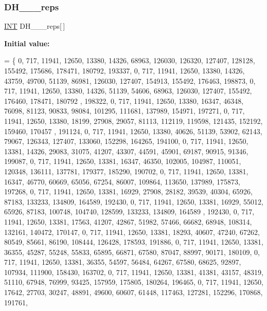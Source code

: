 \subsubsection{\texorpdfstring{D\+H\+\_\+\_\+\_\+reps}{DH\_4\_8\_reps}}
{\footnotesize\ttfamily \mbox{\hyperlink{galois_8h_a09fddde158a3a20bd2dcadb609de11dc}{I\+NT}} D\+H\+\_\+\_\+\_\+reps\mbox{[}$\,$\mbox{]}}

{\bfseries Initial value\+:}
\begin{DoxyCode}
= \{
    0, 717, 11941, 12650, 13380, 14326, 68963, 126030, 126320, 127407, 128128, 155492, 175686, 178471, 
      180792, 193337, 
    0, 717, 11941, 12650, 13380, 14326, 43759, 49700, 51139, 86981, 126030, 127407, 154913, 155492, 176463,
       198873, 
    0, 717, 11941, 12650, 13380, 14326, 51139, 54606, 68963, 126030, 127407, 155492, 176460, 178471, 180792
      , 198322, 
    0, 717, 11941, 12650, 13380, 16347, 46348, 76098, 81123, 90833, 98084, 101295, 111681, 137989, 154971, 
      197271, 
    0, 717, 11941, 12650, 13380, 18199, 27908, 29057, 81113, 112119, 119598, 121435, 152192, 159460, 170457
      , 191124, 
    0, 717, 11941, 12650, 13380, 40626, 51139, 53902, 62143, 79067, 126343, 127407, 133060, 152298, 164265,
       194100, 
    0, 717, 11941, 12650, 13381, 14326, 29083, 31075, 41207, 43307, 44591, 45901, 69187, 90915, 91346, 
      199087, 
    0, 717, 11941, 12650, 13381, 16347, 46350, 102005, 104987, 110051, 120348, 136111, 137781, 179377, 
      185290, 190702, 
    0, 717, 11941, 12650, 13381, 16347, 46770, 60669, 65056, 67254, 86007, 109864, 113650, 137989, 175873, 
      197268, 
    0, 717, 11941, 12650, 13381, 16929, 27908, 28182, 39539, 40304, 65926, 87183, 133233, 134809, 164589, 
      192430, 
    0, 717, 11941, 12650, 13381, 16929, 55012, 65926, 87183, 100748, 104740, 128599, 133233, 134809, 164589
      , 192430, 
    0, 717, 11941, 12650, 13381, 17563, 41207, 42867, 51982, 57466, 66682, 68948, 108314, 132161, 140472, 
      170147, 
    0, 717, 11941, 12650, 13381, 18293, 40607, 47240, 67262, 80549, 85661, 86190, 108444, 126428, 178593, 
      191886, 
    0, 717, 11941, 12650, 13381, 36355, 45287, 55248, 55833, 65895, 66871, 67580, 87047, 88997, 90171, 
      180109, 
    0, 717, 11941, 12650, 13381, 36355, 54597, 56484, 64267, 67580, 68625, 92897, 107934, 111900, 158430, 
      163702, 
    0, 717, 11941, 12650, 13381, 41381, 43157, 48319, 51110, 67948, 76999, 93425, 157959, 175805, 180264, 
      196465, 
    0, 717, 11941, 12650, 17642, 27703, 30247, 48891, 49600, 60607, 61448, 117463, 127281, 152296, 170868, 
      191761, 

\end{DoxyCode}
